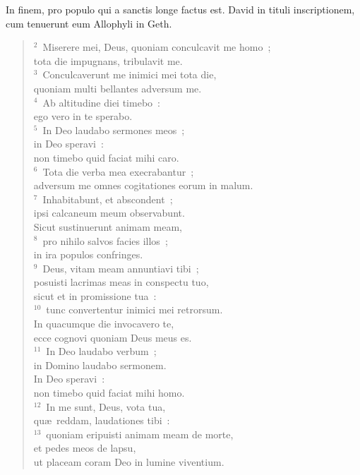\lettrine[lines=3,image=true,loversize=0.05,lraise=-0.03]{I}{}n finem, pro populo qui a sanctis longe factus est. David in tituli inscriptionem, cum tenuerunt eum Allophyli in Geth.
\begin{flushleft}\begin{verse}\vspace{6pt}${}^{2}$~Miserere mei, Deus, quoniam conculcavit me homo~;\\ tota die impugnans, tribulavit me.\\
${}^{3}$~Conculcaverunt me inimici mei tota die,\\ quoniam multi bellantes adversum me.\\
${}^{4}$~Ab altitudine diei timebo~:\\ ego vero in te sperabo.\\
${}^{5}$~In Deo laudabo sermones meos~;\\ in Deo speravi~:\\ non timebo quid faciat mihi caro.\\
${}^{6}$~Tota die verba mea execrabantur~;\\ adversum me omnes cogitationes eorum in malum.\\
${}^{7}$~Inhabitabunt, et abscondent~;\\ ipsi calcaneum meum observabunt.\\ Sicut sustinuerunt animam meam,\\
${}^{8}$~pro nihilo salvos facies illos~;\\ in ira populos confringes.\\
${}^{9}$~Deus, vitam meam annuntiavi tibi~;\\ posuisti lacrimas meas in conspectu tuo,\\ sicut et in promissione tua~:\\
${}^{10}$~tunc convertentur inimici mei retrorsum.\\ In quacumque die invocavero te,\\ ecce cognovi quoniam Deus meus es.\\
${}^{11}$~In Deo laudabo verbum~;\\ in Domino laudabo sermonem.\\ In Deo speravi~:\\ non timebo quid faciat mihi homo.\\
${}^{12}$~In me sunt, Deus, vota tua,\\ qu\ae\ reddam, laudationes tibi~:\\
${}^{13}$~quoniam eripuisti animam meam de morte,\\ et pedes meos de lapsu,\\ ut placeam coram Deo in lumine viventium.\end{verse}\end{flushleft}



